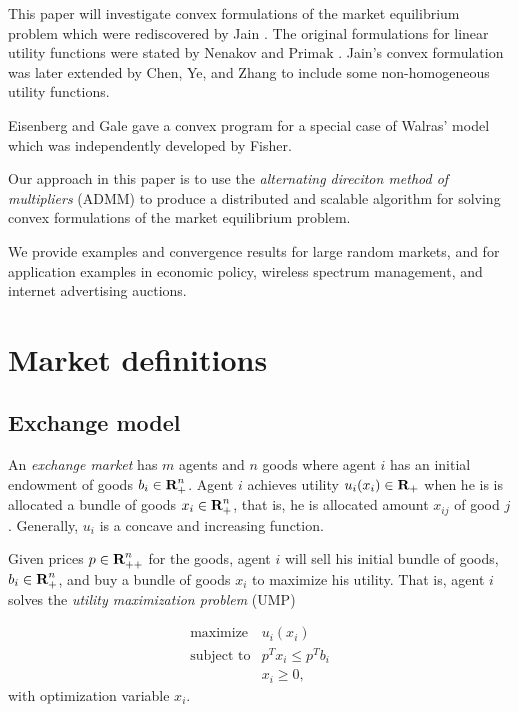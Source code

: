 \documentclass[12pt]{article}
\begin{document}
This paper will investigate convex formulations of the market
equilibrium problem which were rediscovered by Jain \cite{jain2007polynomial}.
The original formulations for linear utility functions
were stated by Nenakov and Primak \cite{nenakov1983algorithm}.
Jain's convex formulation was later extended by Chen, Ye, and Zhang \cite{chen2007note, chen2010equilibrium} to include some non-homogeneous
utility functions.

Eisenberg and Gale \cite{eisenberg1959consensus, gale1960theory, eisenberg1961aggregation} gave a convex program for a special case of Walras' model which was independently developed by Fisher. %

Our approach in this paper is to use the \emph{alternating direciton method of multipliers} (ADMM) \cite{boyd2011distributed} to produce a distributed and scalable algorithm for solving convex formulations of the market equilibrium problem.

We provide examples and convergence results for large random markets, and 
for application examples in economic policy, wireless spectrum management,
and internet advertising auctions.

\section{Market definitions}
\subsection{Exchange model}
An \emph{exchange market} has $m$ agents and $n$ goods where
agent $i$ has an initial endowment of goods $b_i \in {\mbox{\bf R}}_+^n$.
Agent $i$ achieves utility $u_i(x_i) \in {\mbox{\bf R}}_+$ when he is is allocated a
bundle of goods $x_i \in {\mbox{\bf R}}^n_{+}$,
that is, he is allocated amount $x_{ij}$ of good $j$.
Generally, $u_i$ is a concave and increasing function.

Given prices $p \in {\mbox{\bf R}}^n_{++}$ for the goods, agent $i$ will sell his
initial bundle of goods, $b_i \in {\mbox{\bf R}}^n_+ $, and buy a bundle of goods
$x_i$ to maximize his utility.
That is, agent $i$ solves the \emph{utility maximization problem} (UMP)

\begin{equation}
\label{p-ump}
\begin{array}{ll}
\mbox{maximize} & u_i(x_i) \\
\mbox{subject to} & p^T x_i \leq p^T b_i \\
& x_i \geq 0,
\end{array}
\end{equation}
with optimization variable $x_i$.
\end{document}
